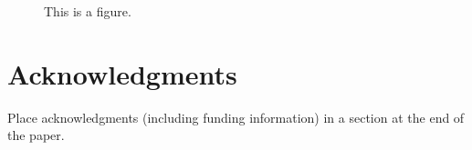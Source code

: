 \documentclass[10pt,letterpaper]{article}
\begin{document}
\begin{figure}[ht]
\begin{center}
\end{center}
\caption{This is a figure.} 
\label{sample-figure}
\end{figure}


\section{Acknowledgments}

Place acknowledgments (including funding information) in a section at
the end of the paper.






\setlength{\bibleftmargin}{.125in}
\setlength{\bibindent}{-\bibleftmargin}


\end{document}
